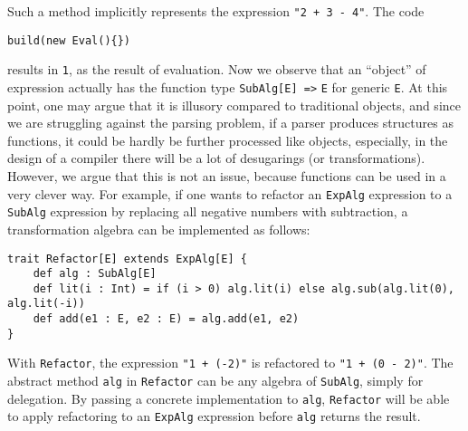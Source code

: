 Such a method implicitly represents the expression \lstinline{"2 + 3 - 4"}. The code
\begin{lstlisting}
build(new Eval(){})
\end{lstlisting}
results in \lstinline{1}, as the result of evaluation. Now we observe that an ``object'' of expression actually
has the function type \lstinline{SubAlg[E] =>} \lstinline{E} for generic \lstinline{E}. At this point, one may argue
that it is illusory compared to traditional objects, and since we are struggling against the parsing problem, if a parser
produces structures as functions, it could be hardly be further processed like objects, especially, in the design of a compiler
there will be a lot of desugarings (or transformations). However, we argue that this is not an issue, because functions can be used
in a very clever way. For example, if one wants to refactor an \lstinline{ExpAlg} expression to a \lstinline{SubAlg} expression by
replacing all negative numbers with subtraction, a transformation algebra can be implemented as follows:
\begin{lstlisting}
trait Refactor[E] extends ExpAlg[E] {
    def alg : SubAlg[E]
    def lit(i : Int) = if (i > 0) alg.lit(i) else alg.sub(alg.lit(0), alg.lit(-i))
    def add(e1 : E, e2 : E) = alg.add(e1, e2)
}
\end{lstlisting}
With \lstinline{Refactor}, the expression \lstinline{"1 + (-2)"} is refactored to \lstinline{"1 + (0 - 2)"}. The abstract method
\lstinline{alg} in \lstinline{Refactor} can be any algebra of \lstinline{SubAlg}, simply for delegation. By passing a concrete implementation
to \lstinline{alg}, \lstinline{Refactor} will be able to apply refactoring to an \lstinline{ExpAlg} expression before \lstinline{alg} returns the result.
